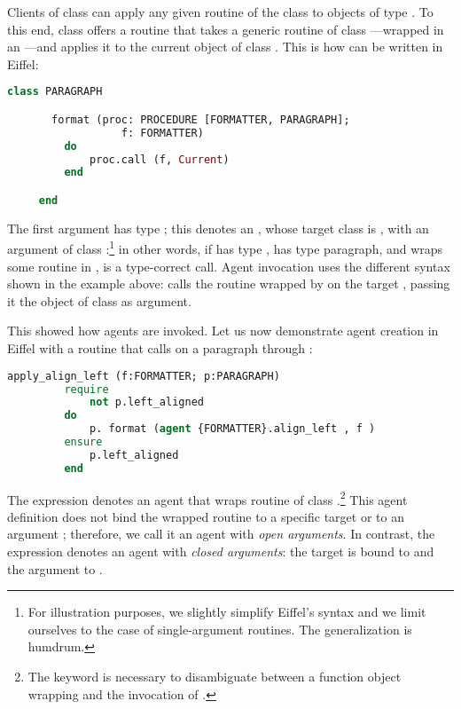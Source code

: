 Clients of class  can apply any given routine of the class to objects of type .
To this end, class  offers a routine  that takes a generic  routine of class ---wrapped in an ---and applies it to the current object of class .
This is how  can be written in Eiffel:

\begin{lstlisting}[language=Eiffel, escapechar=\#]
     class PARAGRAPH

       format (proc: PROCEDURE [FORMATTER, PARAGRAPH];
                  f: FORMATTER)
         do 
             proc.call (f, Current) 
         end

     end
\end{lstlisting}
The first argument has type ; this denotes an , whose target class is , with an argument of class :\footnote{For illustration purposes, we slightly simplify Eiffel's syntax and we limit ourselves to the case of single-argument routines. The generalization is humdrum.} in other words, if  has type ,  has type paragraph, and  wraps some routine  in ,  is a type-correct call.
Agent invocation uses the different syntax shown in the example above:  calls the routine wrapped by  on the target , passing it the  object of class  as argument.


This showed how agents are invoked. Let us now demonstrate agent creation in Eiffel with a routine  that calls  on a paragraph through :

\begin{lstlisting}[language=Eiffel, escapechar=\#]
     apply_align_left (f:FORMATTER; p:PARAGRAPH)
         require   
             not p.left_aligned
         do
             p. format (agent {FORMATTER}.align_left , f )
         ensure
             p.left_aligned   
         end
\end{lstlisting}
The expression  denotes an agent that wraps routine  of class .\footnote{The keyword  is necessary to disambiguate between a function object wrapping  and the invocation of .}
This agent definition does not bind the wrapped routine to a specific target or to an argument ; therefore, we call it an agent with \emph{open arguments}.
In contrast, the expression  denotes an agent with \emph{closed arguments}: the target is bound to  and the argument to .

